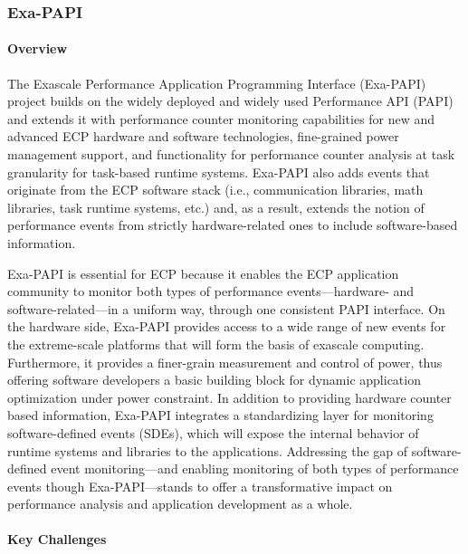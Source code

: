 \subsubsection{Exa-PAPI}\label{subsubsect:exapapi}

\paragraph{Overview} 

The Exascale Performance Application Programming Interface (Exa-PAPI) project
builds on the widely deployed and widely used Performance API (PAPI) and
extends it with performance counter monitoring capabilities for new and
advanced ECP hardware and software technologies, fine-grained power management
support, and functionality for performance counter analysis at task granularity
for task-based runtime systems. Exa-PAPI also adds events that originate from
the ECP software stack (i.e., communication libraries, math libraries, task
runtime systems, etc.) and, as a result, extends the notion of performance
events from strictly hardware-related ones to include software-based information. 

Exa-PAPI is essential for ECP because it enables the ECP application community
to monitor both types of performance events---hardware- and
software-related---in a uniform way, through one consistent PAPI interface. On
the hardware side, Exa-PAPI provides access to a wide range of new
events for the extreme-scale platforms that will form the basis of exascale
computing. Furthermore, it provides a finer-grain measurement and control of
power, thus offering software developers a basic building block for dynamic
application optimization under power constraint.  In addition to providing
hardware counter based information, Exa-PAPI integrates a standardizing layer
for monitoring software-defined events (SDEs), which will expose the internal behavior
of runtime systems and libraries to the applications. Addressing the gap of
software-defined event monitoring---and enabling monitoring of both types of
performance events though Exa-PAPI---stands to offer a transformative impact on
performance analysis and application development as a whole.


\paragraph{Key Challenges}

